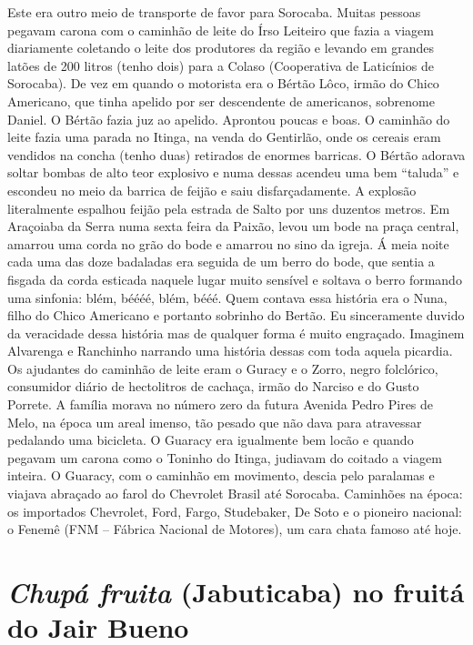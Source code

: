 \documentclass[12pt,brazil,]{book}
\begin{document}
Este era outro meio de transporte de favor para Sorocaba. Muitas pessoas
pegavam carona com o caminhão de leite do Írso Leiteiro que fazia a
viagem diariamente coletando o leite dos produtores da região e levando
em grandes latões de 200 litros (tenho dois) para a Colaso (Cooperativa
de Laticínios de Sorocaba). De vez em quando o motorista era o Bértão
Lôco, irmão do Chico Americano, que tinha apelido por ser descendente de
americanos, sobrenome Daniel. O Bértão fazia juz ao apelido. Aprontou
poucas e boas. O caminhão do leite fazia uma parada no Itinga, na venda
do Gentirlão, onde os cereais eram vendidos na concha (tenho duas)
retirados de enormes barricas. O Bértão adorava soltar bombas de alto
teor explosivo e numa dessas acendeu uma bem ``taluda'' e escondeu no
meio da barrica de feijão e saiu disfarçadamente. A explosão
literalmente espalhou feijão pela estrada de Salto por uns duzentos
metros. Em Araçoiaba da Serra numa sexta feira da Paixão, levou um bode
na praça central, amarrou uma corda no grão do bode e amarrou no sino da
igreja. Á meia noite cada uma das doze badaladas era seguida de um berro
do bode, que sentia a fisgada da corda esticada naquele lugar muito
sensível e soltava o berro formando uma sinfonia: blém, béééé, blém,
bééé. Quem contava essa história era o Nuna, filho do Chico Americano e
portanto sobrinho do Bertão. Eu sinceramente duvido da veracidade dessa
história mas de qualquer forma é muito engraçado. Imaginem Alvarenga e
Ranchinho narrando uma história dessas com toda aquela picardia. Os
ajudantes do caminhão de leite eram o Guracy e o Zorro, negro
folclórico, consumidor diário de hectolitros de cachaça, irmão do
Narciso e do Gusto Porrete. A família morava no número zero da futura
Avenida Pedro Pires de Melo, na época um areal imenso, tão pesado que
não dava para atravessar pedalando uma bicicleta. O Guaracy era
igualmente bem locão e quando pegavam um carona como o Toninho do
Itinga, judiavam do coitado a viagem inteira. O Guaracy, com o caminhão
em movimento, descia pelo paralamas e viajava abraçado ao farol do
Chevrolet Brasil até Sorocaba. Caminhões na época: os importados
Chevrolet, Ford, Fargo, Studebaker, De Soto e o pioneiro nacional: o
Fenemê (FNM -- Fábrica Nacional de Motores), um cara chata famoso até
hoje.

\section{\texorpdfstring{\emph{Chupá fruita} (Jabuticaba) no fruitá do
Jair
Bueno}{Chupá fruita (Jabuticaba) no fruitá do Jair Bueno}}\label{chupuxe1-fruita-jabuticaba-no-fruituxe1-do-jair-bueno}
\end{document}
